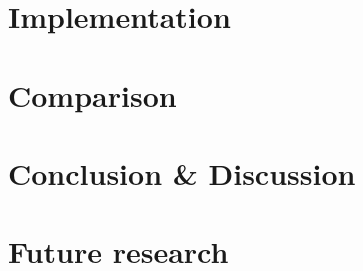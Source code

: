 \documentclass[11pt, titlepage, oneside, a4paper]{report}
\begin{document}








\chapter{Implementation}
\chapter{Comparison}
\chapter{Conclusion \& Discussion}
\chapter{Future research}

\twocolumn


\onecolumn


\end{document}
